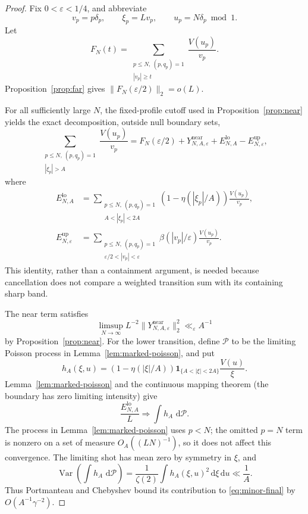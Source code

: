 \documentclass[11pt]{article}
\numberwithin{equation}{section}
\theoremstyle{definition}
\newcommand{\1}{\mathbf 1}
\newcommand{\dd}{\,\mathrm d}
\newcommand{\Var}{\operatorname{Var}}
\begin{document}
\begin{proof}
Fix \(0<\varepsilon<1/4\), and abbreviate
\[
 v_p=p\delta_p,\qquad \xi_p=Lv_p,\qquad
 u_p=N\delta_p\bmod1.
\]
Let
\[
 F_N(t)=
 \sum_{\substack{p\le N,\ (p,q_p)=1\\|v_p|\ge t}}
 \frac{V(u_p)}{v_p}.
\]
Proposition~\ref{prop:far} gives
\(\|F_N(\varepsilon/2)\|_2=o(L)\).

For all sufficiently large \(N\), the fixed-profile cutoff used in
Proposition~\ref{prop:near} yields the exact decomposition, outside null
boundary sets,
\begin{equation}\label{eq:minor-decomposition}
 \sum_{\substack{p\le N,\ (p,q_p)=1\\|\xi_p|>A}}
 \frac{V(u_p)}{v_p}
 =
 F_N(\varepsilon/2)
 +Y^{\mathrm{near}}_{N,A,\varepsilon}
 +E^{\mathrm{lo}}_{N,A}-E^{\mathrm{up}}_{N,\varepsilon},
\end{equation}
where
\begin{align*}
 E^{\mathrm{lo}}_{N,A}
 &=
 \sum_{\substack{p\le N,\ (p,q_p)=1\\A<|\xi_p|<2A}}
 \left(1-\eta(|\xi_p|/A)\right)\frac{V(u_p)}{v_p},\\
 E^{\mathrm{up}}_{N,\varepsilon}
 &=
 \sum_{\substack{p\le N,\ (p,q_p)=1\\
                  \varepsilon/2<|v_p|<\varepsilon}}
 \beta(|v_p|/\varepsilon)\frac{V(u_p)}{v_p}.
\end{align*}
This identity, rather than a containment argument, is needed because
cancellation does not compare a weighted transition sum with its
containing sharp band.

The near term satisfies
\[
 \limsup_{N\to\infty}
 L^{-2}\|Y^{\mathrm{near}}_{N,A,\varepsilon}\|_2^2
 \ll_\varepsilon A^{-1}
\]
by Proposition~\ref{prop:near}.  For the lower transition, define
\(\mathcal P\) to be the limiting Poisson process in
Lemma~\ref{lem:marked-poisson}, and put
\[
 h_A(\xi,u)=
 \left(1-\eta(|\xi|/A)\right)
 \1_{\{A<|\xi|<2A\}}\frac{V(u)}{\xi}.
\]
Lemma~\ref{lem:marked-poisson} and the continuous mapping theorem
(the boundary has zero limiting intensity) give
\[
 \frac{E^{\mathrm{lo}}_{N,A}}L
 \Longrightarrow \int h_A\,\dd\mathcal P.
\]
The process in Lemma~\ref{lem:marked-poisson} uses \(p<N\); the omitted
\(p=N\) term is nonzero on a set of measure \(O_A((LN)^{-1})\), so it
does not affect this convergence.
The limiting shot has mean zero by symmetry in \(\xi\), and
\[
 \Var\!\left(\int h_A\,\dd\mathcal P\right)
 =\frac1{\zeta(2)}\int h_A(\xi,u)^2\dd\xi\dd u
 \ll\frac1A.
\]
Thus Portmanteau and Chebyshev bound its contribution to
\eqref{eq:minor-final} by \(O(A^{-1}\gamma^{-2})\).


\end{proof}
\end{document}
